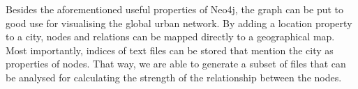 Besides the aforementioned useful properties of Neo4j, the graph can be put to good use for visualising the global urban network. By adding a location property to a city, nodes and relations can be mapped directly to a geographical map. Most importantly, indices of text files can be stored that mention the city as properties of nodes. That way, we are able to generate a subset of files that can be analysed for calculating the strength of the relationship between the nodes.

